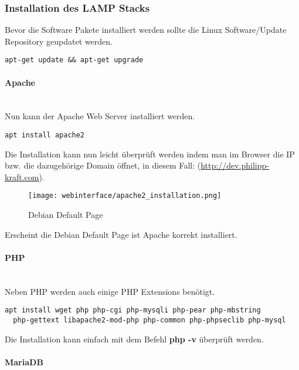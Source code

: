 \subsubsection{Installation des LAMP Stacks}
Bevor die Software Pakete installiert werden sollte die Linux Software/Update
Repository geupdatet werden.

\begin{lstlisting}[caption={Respositorys updaten}]
  apt-get update && apt-get upgrade
\end{lstlisting}

\paragraph{Apache}\mbox{}\\

Nun kann der Apache Web Server installiert werden.

\begin{lstlisting}[caption={Apache installieren}]
  apt install apache2
\end{lstlisting}

Die Installation kann nun leicht überprüft werden indem man im Browser die IP
bzw. die dazugehörige Domain öffnet, in diesem Fall:
(\url{http://dev.philipp-kraft.com}).

\begin{figure}[H]
  \centering
  \texttt{[image: webinterface/apache2\_installation.png]}
  \caption{Debian Default Page}
\end{figure}

Erscheint die Debian Default Page ist Apache korrekt installiert.

\paragraph{PHP}\mbox{}\\
Neben PHP werden auch einige PHP Extensions benötigt.
\begin{lstlisting}[caption={PHP installieren}]
  apt install wget php php-cgi php-mysqli php-pear php-mbstring
  php-gettext libapache2-mod-php php-common php-phpseclib php-mysql
\end{lstlisting}

Die Installation kann einfach mit dem Befehl \textbf{php -v} überprüft werden.

\paragraph{MariaDB}\mbox{}\\

